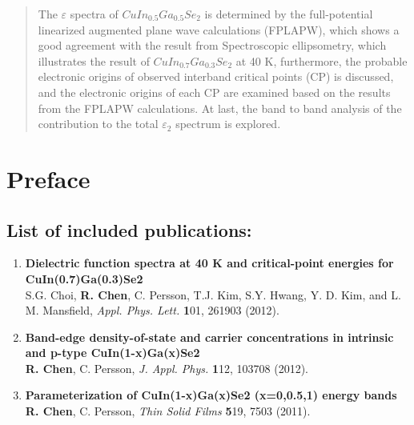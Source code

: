 \documentclass[a4paper, 12pt, titlepage,oneside,drop]{kthesis}
\begin{document}
\begin{abstract}
\noindent The $\varepsilon$ spectra of $CuIn_{0.5}Ga_{0.5}Se_2$ is determined by the full-potential linearized augmented plane wave calculations (FPLAPW), which shows a good 
agreement with the result from Spectroscopic ellipsometry, which illustrates the result of $CuIn_{0.7}Ga_{0.3}Se_2$ at 40 K, furthermore, the probable electronic origins of 
observed interband critical points (CP) is discussed, and the electronic origins of each CP are examined based on the results from the FPLAPW calculations. At 
last, the band to band analysis of the contribution to the total ${\varepsilon_2}$ spectrum is explored.

\end{abstract}

%

%


\newpage
\setcounter{page}{5}

\section*{Preface} 

\subsection*{List of included publications:}

\begin{enumerate}
\renewcommand{\labelenumi}{\Roman{enumi}}
\item{} \textbf{Dielectric function spectra at 40 K and critical-point energies for CuIn(0.7)Ga(0.3)Se2}
\\ S.G. Choi, \textbf{R. Chen}, C. Persson, T.J. Kim, S.Y. Hwang, Y. D. Kim, and L. M. Mansfield,
\textit{Appl. Phys. Lett. } {\textbf 101}, 261903 (2012).

\item{}\textbf{Band-edge density-of-state and carrier concentrations in intrinsic and p-type CuIn(1-x)Ga(x)Se2}
\\\textbf{R. Chen}, C. Persson, \textit{J. Appl. Phys.} {\textbf 112}, 103708 (2012).

\item{} \textbf{Parameterization of CuIn(1-x)Ga(x)Se2 (x=0,0.5,1) energy bands }
\\\textbf{R. Chen}, C. Persson, \textit{Thin Solid Films} {\textbf 519}, 7503 (2011).

\end{enumerate}
\end{document}
